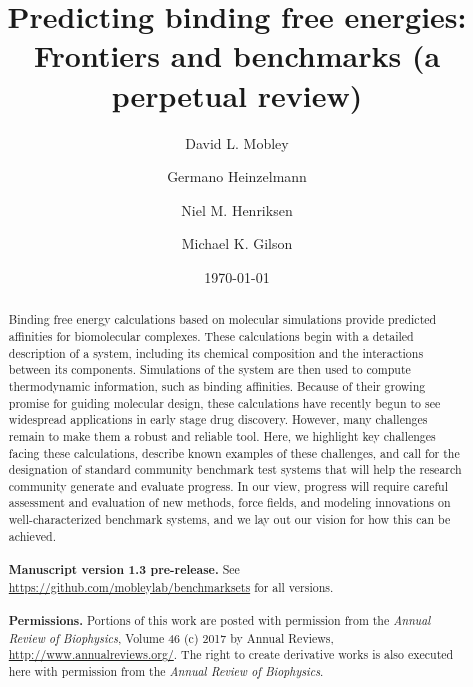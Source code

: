 \documentclass[aps,pre,twocolumn,nofootinbib,superscriptaddress,10pt, final,tightenlines]{revtex4-1}
\begin{document}
\title{Predicting binding free energies: Frontiers and benchmarks (a perpetual review)}

\author{David L. Mobley}
\author{Germano Heinzelmann}
\author{Niel M. Henriksen}
\author{Michael K. Gilson}


\date{\today}

\begin{abstract}
Binding free energy calculations based on molecular simulations provide predicted affinities for biomolecular complexes. 
These calculations begin with a detailed description of a system, including its chemical composition and the interactions between its components. 
Simulations of the system are then used to compute thermodynamic information, such as binding affinities. 
Because of their growing promise for guiding molecular design, these calculations have recently begun to see widespread applications in early stage drug discovery.
However, many challenges remain to make them a robust and reliable tool. 
Here, we highlight key challenges facing these calculations, describe known examples of these challenges, and call for the designation of standard community benchmark  test systems that will help the research community generate and evaluate progress.
In our view, progress will require careful assessment and evaluation of new methods, force fields, and modeling innovations on well-characterized benchmark systems, and we lay out our vision for how this can be achieved.
\\
\\
{\bf Manuscript version 1.3 pre-release.} See \url{https://github.com/mobleylab/benchmarksets} for all versions.
\\
\\
{{\bf Permissions.} Portions of this work are posted with permission from the \emph{Annual Review of Biophysics}, Volume 46 (c) 2017 by Annual Reviews, \url{http://www.annualreviews.org/}. 
The right to create derivative works is also executed here with permission from the \emph{Annual Review of Biophysics}.}

\end{abstract}
\end{document}
